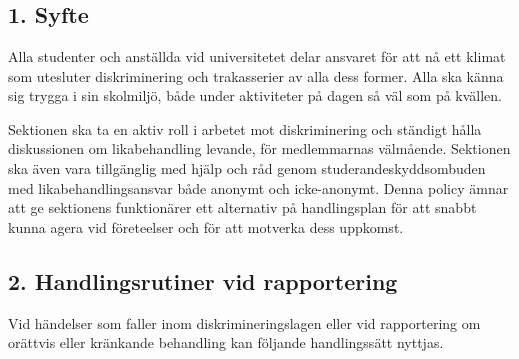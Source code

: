 \documentclass[10pt]{article}
\begin{document}
\section*{\doctitle}
\subsection*{1. Syfte}
Alla studenter och anställda vid universitetet delar ansvaret för att nå ett klimat som utesluter diskriminering och trakasserier av alla dess former. Alla ska känna sig trygga i sin skolmiljö, både under aktiviteter på dagen så väl som på kvällen.

Sektionen ska ta en aktiv roll i arbetet mot diskriminering och ständigt hålla diskussionen om likabehandling levande, för medlemmarnas välmående. Sektionen ska även vara tillgänglig med hjälp och råd genom studerandeskyddsombuden med likabehandlingsansvar både anonymt och icke-anonymt. Denna policy ämnar att ge sektionens funktionärer ett alternativ på handlingsplan för att snabbt kunna agera vid företeelser och för att motverka dess uppkomst.

\subsection*{2. Handlingsrutiner vid rapportering}
Vid händelser som faller inom diskrimineringslagen eller vid rapportering om orättvis eller kränkande behandling kan följande handlingssätt nyttjas.
\end{document}
